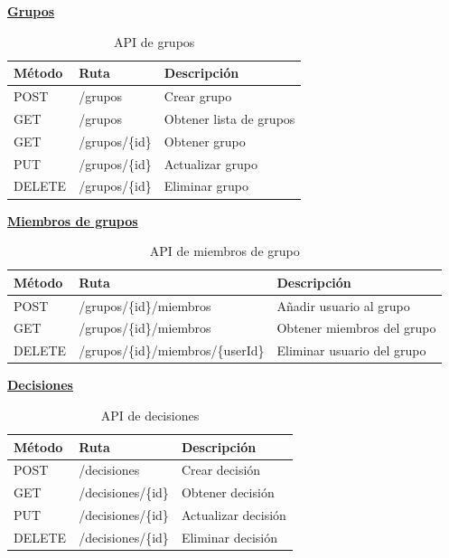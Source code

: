 \textbf{\uline{Grupos}}
\begin{table}[H]
\centering
\begin{tabular}{l l l}
\toprule
\textbf{Método} & \textbf{Ruta} & \textbf{Descripción} \\
\midrule
POST   & /grupos        & Crear grupo \\
GET    & /grupos        & Obtener lista de grupos \\
GET    & /grupos/\{id\} & Obtener grupo \\
PUT    & /grupos/\{id\} & Actualizar grupo \\
DELETE & /grupos/\{id\} & Eliminar grupo \\
\bottomrule
\end{tabular}
\caption{API de grupos}
\end{table}

\textbf{\uline{Miembros de grupos}}
\begin{table}[H]
\centering
\begin{tabular}{l l l}
\toprule
\textbf{Método} & \textbf{Ruta} & \textbf{Descripción} \\
\midrule
POST   & /grupos/\{id\}/miembros             & Añadir usuario al grupo \\
GET    & /grupos/\{id\}/miembros             & Obtener miembros del grupo \\
DELETE & /grupos/\{id\}/miembros/\{userId\}  & Eliminar usuario del grupo \\
\bottomrule
\end{tabular}
\caption{API de miembros de grupo}
\end{table}

\textbf{\uline{Decisiones}}
\begin{table}[H]
\centering
\begin{tabular}{l l l}
\toprule
\textbf{Método} & \textbf{Ruta} & \textbf{Descripción} \\
\midrule
POST   & /decisiones        & Crear decisión \\
GET    & /decisiones/\{id\} & Obtener decisión \\
PUT    & /decisiones/\{id\} & Actualizar decisión \\
DELETE & /decisiones/\{id\} & Eliminar decisión \\
\bottomrule
\end{tabular}
\caption{API de decisiones}
\end{table}

